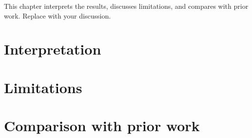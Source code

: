 %

This chapter interprets the results, discusses limitations, and compares with prior work. Replace with your discussion.

\lipsum[31-34]

\section{Interpretation}\label{sec:disc-interp}

\lipsum[35-37]

\section{Limitations}\label{sec:disc-limitations}

\lipsum[38-40]

\section{Comparison with prior work}\label{sec:disc-comparison}

\lipsum[41-42]
